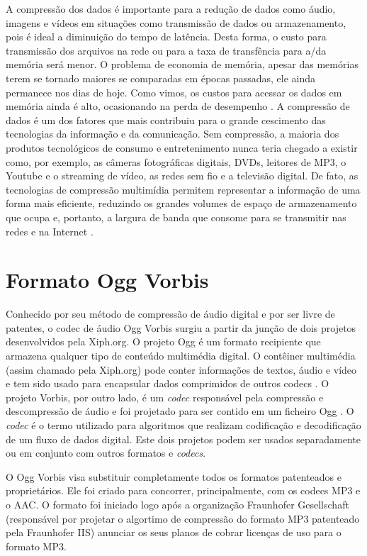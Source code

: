 A compressão dos dados é importante para a redução de dados como áudio, imagens e vídeos em situações como transmissão de dados ou armazenamento, pois é ideal a diminuição do tempo de latência. Desta forma, o custo para transmissão dos arquivos na rede ou para a taxa de transfência para a/da memória será menor. O problema de economia de memória, apesar das memórias terem se tornado maiores se comparadas em épocas passadas, ele ainda permanece nos dias de hoje. Como vimos, os custos para acessar os dados em memória ainda é alto, ocasionando na perda de desempenho \cite{tanenbaumorganizacao}. A compressão de dados é um dos fatores que mais contribuiu para o grande cescimento das tecnologias da informação e da comunicação. Sem compressão, a maioria dos produtos tecnológicos de consumo e entretenimento nunca teria chegado a existir como, por exemplo, as câmeras fotográficas digitais, DVDs, leitores de MP3, o Youtube e o streaming de vídeo, as redes sem fio e a televisão digital. De fato, as tecnologias de compressão multimídia permitem representar a informação de uma forma mais eficiente, reduzindo os grandes volumes de espaço de armazenamento que ocupa e, portanto, a largura de banda que consome para se transmitir nas redes e na Internet \cite{compressaomultimidia}. 


\section{Formato Ogg Vorbis}\label{cap3.4}

Conhecido por seu método de compressão de áudio digital e por ser livre de patentes, o codec de áudio Ogg Vorbis surgiu a partir da junção de dois projetos desenvolvidos pela Xiph.org. O projeto Ogg é um formato recipiente que armazena qualquer tipo de conteúdo multimédia digital. O contêiner multimédia (assim chamado pela Xiph.org) pode conter informações de textos, áudio e vídeo e tem sido usado para encapsular dados comprimidos de outros codecs \cite{ogg}. O projeto Vorbis, por outro lado, é um \textit{codec} responsável pela compressão e descompressão de áudio e foi projetado para ser contido em um ficheiro Ogg \cite{vorbis}. O \textit{codec} é o termo utilizado para algoritmos que realizam codificação e decodificação de um fluxo de dados digital. Este dois projetos podem ser usados separadamente ou em conjunto com outros formatos e \textit{codecs}.

O Ogg Vorbis visa substituir completamente todos os formatos patenteados e proprietários. Ele foi criado para concorrer, principalmente, com os codecs MP3 e o AAC. O formato foi iniciado logo após a organização Fraunhofer Gesellschaft (responsável por projetar o algortimo de compressão do formato MP3 patenteado pela Fraunhofer IIS) anunciar os seus planos de cobrar licenças de uso para o formato MP3.

